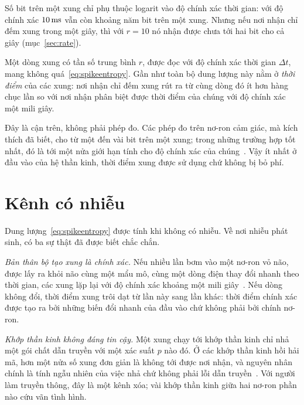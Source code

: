 Số bit trên một xung chỉ phụ thuộc logarit vào độ chính xác thời gian: với độ chính xác $10\,\text{ms}$ vẫn còn khoảng năm bit trên một xung. Nhưng nếu nơi nhận chỉ đếm xung trong một giây, thì với $r=10$ nó nhận được chưa tới hai bit cho cả giây (mục~\ref{sec:rate}).

\begin{keyblock}
\begin{proposition}
\label{prop:capacity}
Một dòng xung có tần số trung bình $r$, được đọc với độ chính xác thời gian $\Delta t$, mang không quá~\eqref{eq:spikeentropy}. Gần như toàn bộ dung lượng này nằm ở \emph{thời điểm} của các xung: nơi nhận chỉ đếm xung rút ra từ cùng dòng đó ít hơn hàng chục lần so với nơi nhận phân biệt được thời điểm của chúng với độ chính xác một mili giây.
\end{proposition}
\end{keyblock}

Đây là cận trên, không phải phép đo. Các phép đo trên nơ-ron cảm giác, mà kích thích đã biết, cho từ một đến vài bit trên một xung; trong những trường hợp tốt nhất, đó là tới một nửa giới hạn tính cho độ chính xác của chúng~\cite{Rieke1997}. Vậy ít nhất ở đầu vào của hệ thần kinh, thời điểm xung được sử dụng chứ không bị bỏ phí.

\section{Kênh có nhiễu}

Dung lượng~\eqref{eq:spikeentropy} được tính khi không có nhiễu. Về nơi nhiễu phát sinh, có ba sự thật đã được biết chắc chắn.

\emph{Bản thân bộ tạo xung là chính xác.} Nếu nhiều lần bơm vào một nơ-ron vỏ não, được lấy ra khỏi não cùng một mẩu mô, cùng một dòng điện thay đổi nhanh theo thời gian, các xung lặp lại với độ chính xác khoảng một mili giây~\cite{Mainen1995}. Nếu dòng không đổi, thời điểm xung trôi dạt từ lần này sang lần khác: thời điểm chính xác được tạo ra bởi những biến đổi nhanh của đầu vào chứ không phải bởi chính nơ-ron.

\emph{Khớp thần kinh không đáng tin cậy.} Một xung chạy tới khớp thần kinh  chỉ nhả một gói chất dẫn truyền với một xác suất $p$ nào đó. Ở các khớp thần kinh hồi hải mã, hơn một nửa số xung đơn giản là không tới được nơi nhận, và nguyên nhân chính là tính ngẫu nhiên của việc nhả chứ không phải lỗi dẫn truyền~\cite{AllenStevens1994}. Với người làm truyền thông, đây là một kênh xóa; vài khớp thần kinh giữa hai nơ-ron phần nào cứu vãn tình hình.

